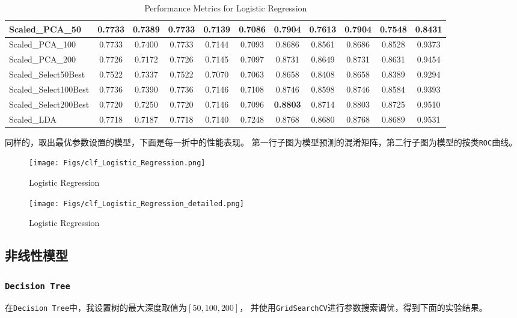 \documentclass[12pt, a4paper, oneside]{ctexart}
\begin{document}
\begin{table}[H]
{\begin{tabular}{|l|c|c|c|c|c|c|c|c|c|c|}
    Scaled\_PCA\_50 & 0.7733 & 0.7389 & 0.7733 & 0.7139 & 0.7086 & 0.7904 & 0.7613 & 0.7904 & 0.7548 & 0.8431 \\ \hline
    Scaled\_PCA\_100 & 0.7733 & 0.7400 & 0.7733 & 0.7144 & 0.7093 & 0.8686 & 0.8561 & 0.8686 & 0.8528 & 0.9373 \\ \hline
    Scaled\_PCA\_200 & 0.7726 & 0.7172 & 0.7726 & 0.7145 & 0.7097 & 0.8731 & 0.8649 & 0.8731 & 0.8631 & 0.9454 \\ \hline
    Scaled\_Select50Best & 0.7522 & 0.7337 & 0.7522 & 0.7070 & 0.7063 & 0.8658 & 0.8408 & 0.8658 & 0.8389 & 0.9294 \\ \hline
    Scaled\_Select100Best & 0.7736 & 0.7390 & 0.7736 & 0.7146 & 0.7108 & 0.8746 & 0.8598 & 0.8746 & 0.8584 & 0.9393 \\ \hline
    Scaled\_Select200Best & 0.7720 & 0.7250 & 0.7720 & 0.7146 & 0.7096 & \textbf{0.8803} & 0.8714 & 0.8803 & 0.8725 & 0.9510 \\ \hline
    Scaled\_LDA & 0.7718 & 0.7187 & 0.7718 & 0.7140 & 0.7248 & 0.8768 & 0.8680 & 0.8768 & 0.8689 & 0.9531 \\ \hline
    \end{tabular}
    }
    \caption{Performance Metrics for Logistic Regression}
\end{table}

同样的，取出最优参数设置的模型，下面是每一折中的性能表现。
第一行子图为模型预测的混淆矩阵，第二行子图为模型的按类\texttt{ROC}曲线。

\begin{figure}[H]
    \centering
    \texttt{[image: Figs/clf\_Logistic\_Regression.png]}
    \caption{Logistic Regression}
\end{figure}

\begin{figure}[H]
    \centering
    \texttt{[image: Figs/clf\_Logistic\_Regression\_detailed.png]}
    \caption{Logistic Regression}
\end{figure}

\subsection{非线性模型}
\subsubsection{\texttt{Decision Tree}}
在\texttt{Decision Tree}中，我设置树的最大深度取值为$\left[50, 100, 200\right]$，
并使用\texttt{GridSearchCV}进行参数搜索调优，得到下面的实验结果。
\end{document}
